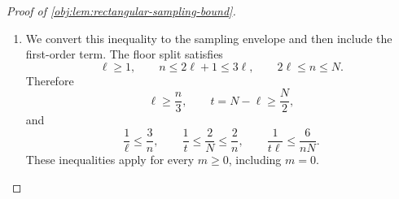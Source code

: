 \documentclass[11pt]{article}
\begin{document}
\begin{proof}[Proof of \cref{obj:lem:rectangular-sampling-bound}]
\begin{enumerate}
To compute the rectangular second moment, recall the independent-sample identity. For \(n_{\mathrm{av}}\ge1\) independent identically distributed square-integrable real variables \(Z_{\mathrm{av},j}\), define
\[
\overline Z_{\mathrm{av}}
=\frac1{n_{\mathrm{av}}}
 \sum_{j=1}^{n_{\mathrm{av}}}Z_{\mathrm{av},j}.
\]
Expanding the square and factoring the mixed expectations gives
\[
\mathbb E\,\overline Z_{\mathrm{av}}^2
=\frac1{n_{\mathrm{av}}}\mathbb E Z_{\mathrm{av},1}^2
 +\left(1-\frac1{n_{\mathrm{av}}}\right)
   (\mathbb E Z_{\mathrm{av},1})^2.
\]
Apply this identity first to the outcome-record average, with the treatment records fixed, and then to the treatment-record averages. Finite-sum integration commutes with taking the slice means. Since \(H_{\diamond,0}\) has mean zero, the resulting identity is
\[
\begin{aligned}
\mathbb E(\widehat H_\diamond-\mu_\diamond)^2
&=\frac{\mathbb E H_{\diamond,0}^2}{t\ell}\\
&\quad+\frac1t\left(1-\frac1\ell\right)
       \mathbb E H_{\diamond,1}^2\\
&\quad+\left(1-\frac1t\right)\frac1\ell
       \mathbb E H_{\diamond,2}^2.
\end{aligned}
\]
Substituting the residual-energy identity above reduces this to
\[
\mathbb E(\widehat H_\diamond-\mu_\diamond)^2
=\frac{\mathbb E H_{\diamond,1}^2}{t}
 +\frac{\mathbb E H_{\diamond,2}^2}{\ell}
 +\frac{\mathbb E H_{\diamond,12}^2}{t\ell}.
\]
The three preceding energy comparisons imply
\[
\mathbb E(\widehat H_\diamond-\mu_\diamond)^2
\le
\frac{\mathbb E H_{\diamond,T}^2}{t}
+\frac{\mathbb E H_{\diamond,L}^2}{\ell}
+\frac{\mathbb E H_\diamond^2}{t\ell}.
\]

\item We convert this inequality to the sampling envelope and then include the first-order term. The floor split satisfies
\[
\ell\ge1,\qquad n\le2\ell+1\le3\ell,
\qquad 2\ell\le n\le N.
\]
Therefore
\[
\ell\ge\frac n3,\qquad
t=N-\ell\ge\frac N2,
\]
and
\[
\frac1\ell\le\frac3n,\qquad
\frac1t\le\frac2N\le\frac2n,\qquad
\frac1{t\ell}\le\frac6{nN}.
\]
These inequalities apply for every \(m\ge0\), including \(m=0\).


\end{enumerate}
\end{proof}
\end{document}
